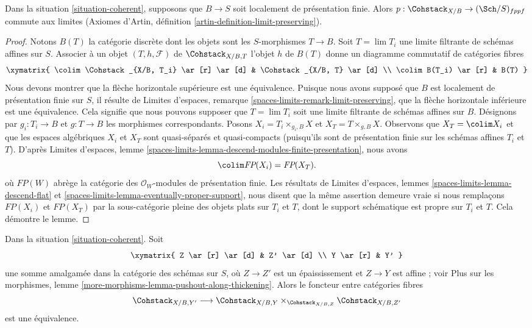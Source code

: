 \begin{lemma}
\label{lemma-coherent-limits}
Dans la situation \ref{situation-coherent}, supposons que $B \to S$ soit
localement de présentation finie. Alors
$p : \Cohstack_{X/B} \to (\Sch/S)_{fppf}$ commute aux limites (Axiomes
d'Artin, définition \ref{artin-definition-limit-preserving}).
\end{lemma}

\begin{proof}
Notons $B(T)$ la catégorie discrète dont les objets sont les $S$-morphismes
$T \to B$. Soit $T = \lim T_i$ une limite filtrante de schémas affines sur
$S$. Associer à un objet $(T, h, \mathcal{F})$ de
$\Cohstack_{X/B, T}$ l'objet $h$ de $B(T)$ donne un diagramme commutatif de
catégories fibres
$$
\xymatrix{
\colim \Cohstack_{X/B, T_i} \ar[r] \ar[d] &
\Cohstack_{X/B, T} \ar[d] \\
\colim B(T_i) \ar[r] & B(T)
}
$$
Nous devons montrer que la flèche horizontale supérieure est une équivalence.
Puisque nous avons supposé que $B$ est localement de présentation finie sur
$S$, il résulte de Limites d'espaces, remarque
\ref{spaces-limits-remark-limit-preserving}, que la flèche horizontale
inférieure est une équivalence. Cela signifie que nous pouvons supposer que
$T = \lim T_i$ soit une limite filtrante de schémas affines sur $B$.
Désignons par $g_i : T_i \to B$ et $g : T \to B$ les morphismes
correspondants. Posons $X_i = T_i \times_{g_i, B} X$ et
$X_T = T \times_{g, B} X$. Observons que $X_T = \colim X_i$ et que les
espaces algébriques $X_i$ et $X_T$ sont quasi-séparés et quasi-compacts
(puisqu'ils sont de présentation finie sur les schémas affines $T_i$ et $T$).
D'après Limites d'espaces, lemme
\ref{spaces-limits-lemma-descend-modules-finite-presentation}, nous avons
$$
\colim \textit{FP}(X_i) = \textit{FP}(X_T).
$$
où $\textit{FP}(W)$ abrège la catégorie des $\mathcal{O}_W$-modules de
présentation finie. Les résultats de Limites d'espaces, lemmes
\ref{spaces-limits-lemma-descend-flat} et
\ref{spaces-limits-lemma-eventually-proper-support}, nous disent que la même
assertion demeure vraie si nous remplaçons $\textit{FP}(X_i)$ et
$\textit{FP}(X_T)$ par la sous-catégorie pleine des objets plats sur $T_i$ et
$T$, dont le support schématique est propre sur $T_i$ et $T$. Cela démontre le
lemme.
\end{proof}

\begin{lemma}
\label{lemma-coherent-RS-star}
Dans la situation \ref{situation-coherent}. Soit
$$
\xymatrix{
Z \ar[r] \ar[d] & Z' \ar[d] \\
Y \ar[r] & Y'
}
$$
une somme amalgamée dans la catégorie des schémas sur $S$, où
$Z \to Z'$ est un épaississement et $Z \to Y$ est affine ; voir Plus sur les
morphismes, lemme
\ref{more-morphisms-lemma-pushout-along-thickening}. Alors le foncteur entre
catégories fibres
$$
\Cohstack_{X/B, Y'}
\longrightarrow
\Cohstack_{X/B, Y} \times_{\Cohstack_{X/B, Z}} \Cohstack_{X/B, Z'}
$$
est une équivalence.
\end{lemma}

